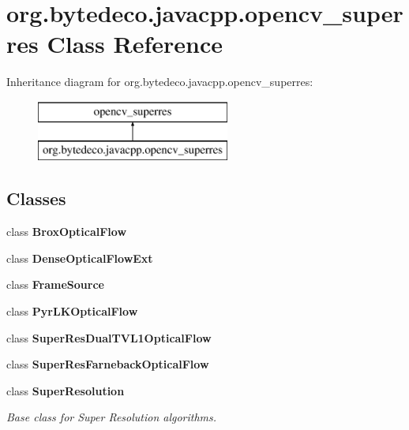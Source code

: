 \hypertarget{classorg_1_1bytedeco_1_1javacpp_1_1opencv__superres}{}\section{org.\+bytedeco.\+javacpp.\+opencv\+\_\+superres Class Reference}
\label{classorg_1_1bytedeco_1_1javacpp_1_1opencv__superres}
Inheritance diagram for org.\+bytedeco.\+javacpp.\+opencv\+\_\+superres\+:\begin{figure}[H]
\begin{center}
\leavevmode
\includegraphics[height=2.000000cm]{classorg_1_1bytedeco_1_1javacpp_1_1opencv__superres}
\end{center}
\end{figure}
\subsection*{Classes}
\begin{DoxyCompactItemize}
\item 
class {\bfseries Brox\+Optical\+Flow}
\item 
class {\bfseries Dense\+Optical\+Flow\+Ext}
\item 
class {\bfseries Frame\+Source}
\item 
class {\bfseries Pyr\+L\+K\+Optical\+Flow}
\item 
class {\bfseries Super\+Res\+Dual\+T\+V\+L1\+Optical\+Flow}
\item 
class {\bfseries Super\+Res\+Farneback\+Optical\+Flow}
\item 
class {\bfseries Super\+Resolution}
\begin{DoxyCompactList}\small\item\em Base class for Super Resolution algorithms. \end{DoxyCompactList}\end{DoxyCompactItemize}
